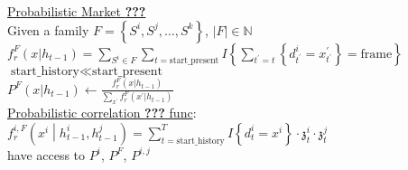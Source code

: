 \underline{Probabilistic Market \textbf{???}} \\



Given a family $F=\left\{ S^i, S^j, \ldots, S^k \right\}$, $|F|\in\mathbb{N}$ \\

$f_r^F(x|h_{t-1}) = \sum_{S^i \in F} \sum_{t=\text{start\_present}} I\left\{ \sum_{t^\prime = t}\left\{ d^i_{t^\prime} = x^\prime_{t^\prime} \right\} = \text{frame}\right\}$ \\
$\text{start\_history} \ll \text{start\_present}$ \\
$P^F(x|h_{t-1}) \leftarrow \frac{f_r^F(x|h_{t-1})}{\sum_{x^\prime}f_r^F(x^\prime|h_{t-1})}$ \\

\underline{Probabilistic correlation \textbf{???} func}: \\

$f_r^{i,F}\left( x^i \middle| h^i_{t-1}, h^j_{t-1} \right) = \sum_{t=\text{start\_history}}^{T}I\left\{ d^{i}_{t} = x^i \right\} \cdot \mathfrak{z}^i_t \cdot \mathfrak{z}^j_t$ \\
have access to $P^i$, $P^F$, $P^{i,j}$
